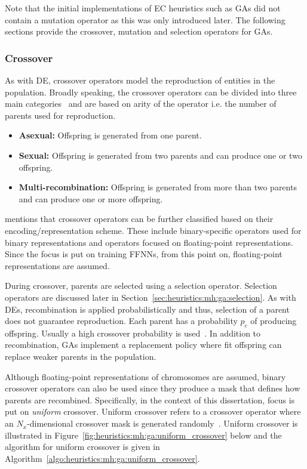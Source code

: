 Note that the initial implementations of \acs{EC} heuristics such as \acp{GA} did not contain a mutation operator as this was only introduced later. The following sections provide the crossover, mutation and selection operators for \acp{GA}.

\subsubsection{Crossover}
\label{sec:heuristics:mh:ga:crossover}

As with \acs{DE}, crossover operators model the reproduction of entities in the population. Broadly speaking, the crossover operators can be divided into three main categories~\cite{ref:engelbrecht:2007} and are based on arity of the operator i.e. the number of parents used for reproduction.

\begin{itemize}
      \item \textbf{Asexual: } Offspring is generated from one parent.

      \item \textbf{Sexual: } Offspring is generated from two parents and can produce one or two offspring.

      \item \textbf{Multi-recombination: } Offspring is generated from more than two parents and can produce one or more offspring.
\end{itemize}

\citeauthor{ref:engelbrecht:2007}\cite{ref:engelbrecht:2007} mentions that crossover operators can be further classified based on their encoding/representation scheme. These include binary-specific operators used for binary representations and operators focused on floating-point representations. Since the focus is put on training \acp{FFNN}, from this point on, floating-point representations are assumed.

During crossover, parents are selected using a selection operator. Selection operators are discussed later in Section~\ref{sec:heuristics:mh:ga:selection}. As with \acp{DE}, recombination is applied probabilistically and thus, selection of a parent does not guarantee reproduction. Each parent has a probability $p_{c}$ of producing offspring. Usually a high crossover probability is used~\cite{ref:engelbrecht:2007}. In addition to recombination, \acp{GA} implement a replacement policy where fit offspring can replace weaker parents in the population.

Although floating-point representations of chromosomes are assumed, binary crossover operators can also be used since they produce a mask that defines how parents are recombined. Specifically, in the context of this dissertation, focus is put on \textit{uniform} crossover. Uniform crossover refers to a crossover operator where an $N_{x}$-dimensional crossover mask is generated randomly~\cite{ref:syswerda:1989}. Uniform crossover is illustrated in Figure~\ref{fig:heuristics:mh:ga:uniform_crossover} below and the algorithm for uniform crossover is given in Algorithm~\ref{algo:heuristics:mh:ga:uniform_crossover}.



